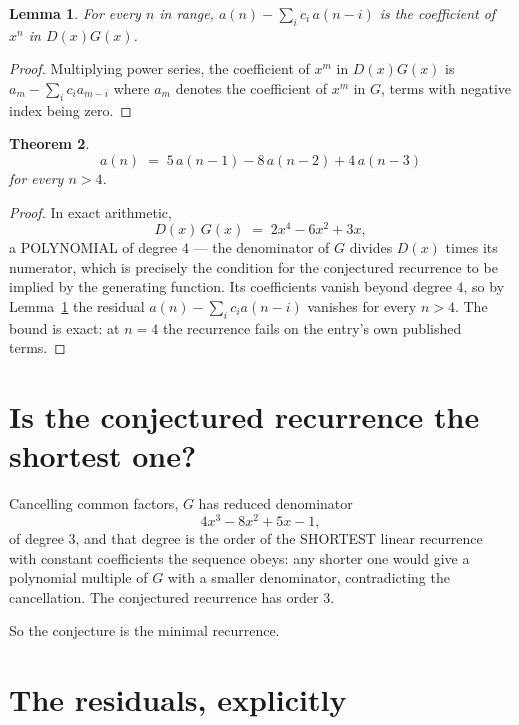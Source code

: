 \documentclass[11pt,a4paper]{article}
\theoremstyle{plain}
\newtheorem{theorem}{Theorem}
\newtheorem{lemma}[theorem]{Lemma}
\theoremstyle{definition}
\begin{document}
\begin{lemma}\label{lem:key}
For every $n$ in range, $a(n)-\sum_i c_i\,a(n-i)$ is the coefficient of $x^{n}$ in
$D(x)G(x)$.
\end{lemma}

\begin{proof}
Multiplying power series, the coefficient of $x^{m}$ in $D(x)G(x)$ is
$a_m-\sum_i c_i a_{m-i}$ where $a_m$ denotes the coefficient of $x^{m}$ in $G$, terms with
negative index being zero.
\end{proof}

\begin{theorem}
\[
a(n)\;=\;5\,a(n-1) - 8\,a(n-2) + 4\,a(n-3)
\]
for every $n>4$.
\end{theorem}

\begin{proof}
In exact arithmetic,
\[
D(x)\,G(x)\;=\;2 x^{4} - 6 x^{2} + 3 x,
\]
a POLYNOMIAL of degree $4$ --- the denominator of $G$ divides $D(x)$ times its numerator,
which is precisely the condition for the conjectured recurrence to be implied by the
generating function. Its coefficients vanish beyond degree $4$, so by
Lemma~\ref{lem:key} the residual $a(n)-\sum_ic_ia(n-i)$ vanishes for every
$n>4$. The bound is exact: at $n=4$ the recurrence fails on the entry's own published terms.
\end{proof}

\section{Is the conjectured recurrence the shortest one?}

Cancelling common factors, $G$ has reduced denominator
\[
4 x^{3} - 8 x^{2} + 5 x - 1,
\]
of degree $3$, and that degree is the order of the SHORTEST linear recurrence with
constant coefficients the sequence obeys: any shorter one would give a polynomial multiple of
$G$ with a smaller denominator, contradicting the cancellation. The conjectured recurrence has
order $3$.

So the conjecture is the minimal recurrence.

\section{The residuals, explicitly}
\end{document}

